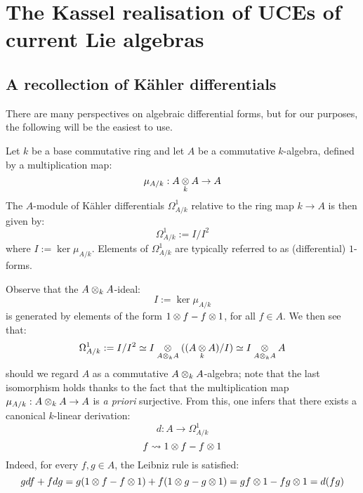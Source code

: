 \section{The Kassel realisation of UCEs of current Lie algebras}
    \subsection{A recollection of K\"ahler differentials}
        There are many perspectives on algebraic differential forms, but for our purposes, the following will be the easiest to use.
        \begin{definition} \label{def: kahler_differentials}
            Let $k$ be a base commutative ring and let $A$ be a commutative $k$-algebra, defined by a multiplication map:
                $$\mu_{A/k}: A \tensor_k A \to A$$
            The $A$-module of K\"ahler differentials $\Omega^1_{A/k}$ relative to the ring map $k \to A$ is then given by:
                $$\Omega^1_{A/k} := I/I^2$$
            where $I := \ker \mu_{A/k}$. Elements of $\Omega^1_{A/k}$ are typically referred to as (differential) $1$-forms.
        \end{definition}
        \begin{remark}
            Observe that the $A \tensor_k A$-ideal:
                $$I := \ker \mu_{A/k}$$
            is generated by elements of the form $1 \tensor f - f \tensor 1$, for all $f \in A$. We then see that:
                $$\Omega^1_{A/k} := I/I^2 \cong I \tensor_{A \tensor_k A} ( (A \tensor_k A)/I ) \cong I \tensor_{A \tensor_k A} A$$
            should we regard $A$ as a commutative $A \tensor_k A$-algebra; note that the last isomorphism holds thanks to the fact that the multiplication map $\mu_{A/k}: A \tensor_k A \to A$ is \textit{a priori} surjective. From this, one infers that there exists a canonical $k$-linear derivation:
                $$d: A \to \Omega^1_{A/k}$$
                $$f \mapsto 1 \tensor f - f \tensor 1$$
            Indeed, for every $f, g \in A$, the Leibniz rule is satisfied:
                $$g df + f dg = g(1 \tensor f - f \tensor 1) + f(1 \tensor g - g \tensor 1) = gf \tensor 1 - fg \tensor 1 = d(fg)$$
        \end{remark}
        
